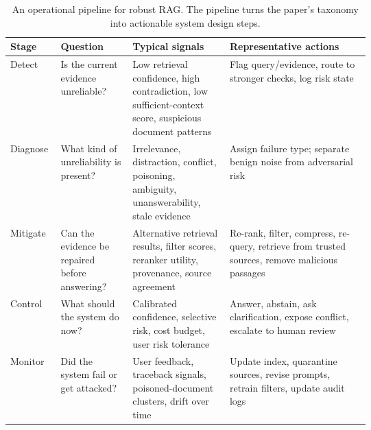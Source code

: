 \begin{table}[t]
\centering
\small
\begin{tabularx}{\linewidth}{p{0.14\linewidth}p{0.2\linewidth}p{0.27\linewidth}X}
\toprule
\textbf{Stage} & \textbf{Question} & \textbf{Typical signals} & \textbf{Representative actions} \\
\midrule
Detect & Is the current evidence unreliable? & Low retrieval confidence, high contradiction, low sufficient-context score, suspicious document patterns & Flag query/evidence, route to stronger checks, log risk state \\
Diagnose & What kind of unreliability is present? & Irrelevance, distraction, conflict, poisoning, ambiguity, unanswerability, stale evidence & Assign failure type; separate benign noise from adversarial risk \\
Mitigate & Can the evidence be repaired before answering? & Alternative retrieval results, filter scores, reranker utility, provenance, source agreement & Re-rank, filter, compress, re-query, retrieve from trusted sources, remove malicious passages \\
Control & What should the system do now? & Calibrated confidence, selective risk, cost budget, user risk tolerance & Answer, abstain, ask clarification, expose conflict, escalate to human review \\
Monitor & Did the system fail or get attacked? & User feedback, traceback signals, poisoned-document clusters, drift over time & Update index, quarantine sources, revise prompts, retrain filters, update audit logs \\
\bottomrule
\end{tabularx}
\caption{An operational pipeline for robust RAG. The pipeline turns the paper's taxonomy into actionable system design steps.}
\label{tab:operational-pipeline}
\end{table}
